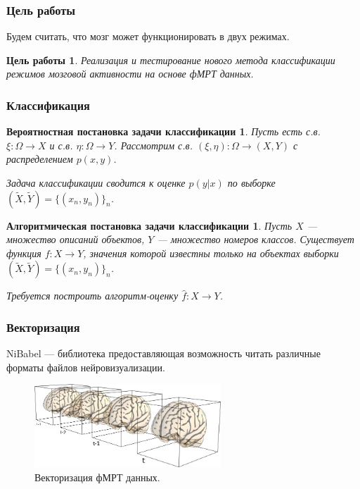 \documentclass{beamer}
\newtheorem{target_}{Цель работы}
\newtheorem{prob_task}{Вероятностная постановка задачи классификации}
\newtheorem{algo_task}{Алгоритмическая постановка задачи классификации}
\begin{document}
	\begin{frame} 
		\frametitle{Цель работы}
		Будем считать, что мозг может функционировать в двух режимах.
		
		\begin{target_}
			Реализация и тестирование нового метода классификации режимов мозговой активности на основе фМРТ данных.
		\end{target_}			
	\end{frame}

	\begin{frame} 
		\frametitle{Классификация}
		\begin{prob_task}
			Пусть есть с.в. $\xi: \Omega \rightarrow X$ и с.в. $\eta: \Omega \rightarrow Y$. Рассмотрим с.в. $(\xi, \eta): \Omega \rightarrow (X, Y)$ с распределением $p(x, y)$.
			\vspace{0.5cm}
			
			Задача классификации сводится к оценке $p(y|x)$ по выборке $(\widetilde{X}, \widetilde{Y}) = \{(x_{n}, y_{n})\}_n$.
		\end{prob_task}
	
		\begin{algo_task}
			Пусть $X$ --- множество описаний объектов, $Y$ --- множество номеров классов. Существует функция $f: X \rightarrow Y$, значения которой известны только на объектах выборки $(\widetilde{X}, \widetilde{Y}) =  \{(x_{n}, y_{n})\}_n$. 
			\vspace{0.5cm}
			
			Требуется построить алгоритм-оценку $\widehat{f}: X \rightarrow Y$.
		\end{algo_task}
	\end{frame}

	\begin{frame} 	
		\frametitle{Векторизация}	
		
		NiBabel --- библиотека предоставляющая возможность читать различные форматы файлов нейровизуализации.
		\vspace{0.5cm}
				
		\begin{figure}
			\includegraphics[width=7cm]{../images/vectorization_1.png}
			\caption{Векторизация фМРТ данных.} 
			\label{fg:5}
		\end{figure}
	\end{frame}
	
\end{document}
